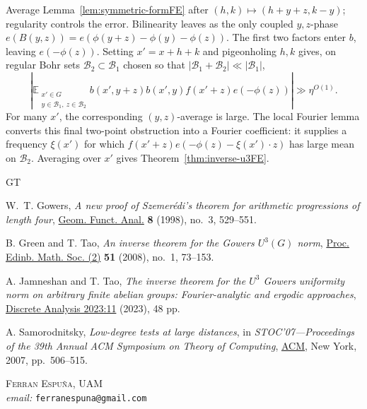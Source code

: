 \documentclass[12pt]{article}
\begin{document}
Average Lemma~\ref{lem:symmetric-formFE} after
$(h,k)\mapsto(h+y+z,k-y)$; regularity controls the error.  Bilinearity leaves
as the only coupled $y,z$-phase
$e(B(y,z))=e(\phi(y+z)-\phi(y)-\phi(z))$.  The first two factors enter $b$,
leaving $e(-\phi(z))$.  Setting $x'=x+h+k$ and pigeonholing $h,k$ gives, on
regular Bohr sets $\mathcal B_2\subset\mathcal B_1$ chosen so that
$|\mathcal B_1+\mathcal B_2|\ll|\mathcal B_1|$,
\[
 \left|\mathbb{E}_{\substack{x'\in G\\y\in\mathcal B_1,\ z\in\mathcal B_2}}
 b(x',y+z)b(x',y)f(x'+z)e(-\phi(z))\right|
 \gg\eta^{O(1)}.
\]
For many $x'$, the corresponding $(y,z)$-average is large.  The local
Fourier lemma \cite[Lemma~4.4]{GreenTaoFE} converts this final two-point
obstruction into a Fourier coefficient: it supplies a frequency $\xi(x')$
for which $f(x'+z)e(-\phi(z)-\xi(x')\cdot z)$ has large mean on $\mathcal B_2$.
Averaging over $x'$ gives Theorem~\ref{thm:inverse-u3FE}.

\begin{thebibliography}{GT}

W.~T. Gowers,
\emph{A new proof of Szemer\'edi's theorem for arithmetic progressions of
length four},
\href{https://doi.org/10.1007/s000390050065}{Geom. Funct. Anal.}
\textbf{8} (1998), no.~3, 529--551.

B. Green and T. Tao,
\emph{An inverse theorem for the Gowers $U^3(G)$ norm},
\href{https://doi.org/10.1017/S0013091505000325}{Proc. Edinb. Math. Soc. (2)}
\textbf{51} (2008), no.~1, 73--153.

A. Jamneshan and T. Tao,
\emph{The inverse theorem for the $U^3$ Gowers uniformity norm on arbitrary
finite abelian groups: Fourier-analytic and ergodic approaches},
\href{https://doi.org/10.19086/da.84268}{Discrete Analysis 2023:11}
(2023), 48 pp.

A. Samorodnitsky,
\emph{Low-degree tests at large distances},
in \emph{STOC'07---Proceedings of the 39th Annual ACM Symposium on Theory of
Computing}, \href{https://doi.org/10.1145/1250790.1250864}{ACM}, New York,
2007, pp.~506--515.

\end{thebibliography}

\noindent \textsc{Ferran Espuña, UAM}\\
\textit{email:} \texttt{ferranespuna@gmail.com}

\end{document}
